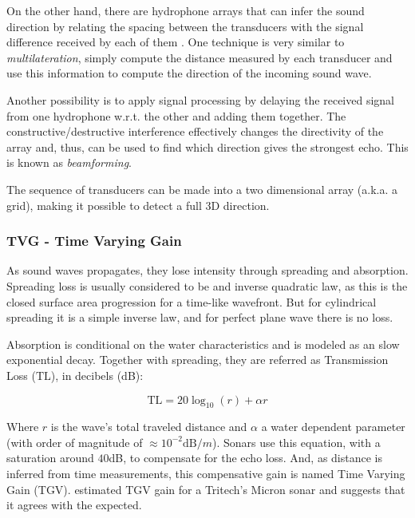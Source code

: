 On the other hand, there are hydrophone arrays that can infer the sound
direction by relating the spacing between the transducers with the signal
difference received by each of them \cite{bearing,beamforming}. One technique is
very similar to \textit{multilateration}, simply compute the distance measured
by each transducer and use this information to compute the direction of the
incoming sound wave.


Another possibility is to apply signal processing by delaying the received
signal from one hydrophone w.r.t. the other and adding them together. The
constructive/destructive interference effectively changes the directivity of the
array and, thus, can be used to find which direction gives the strongest echo.
This is known as \textit{beamforming}.

The sequence of transducers can be made into a two dimensional array
(a.k.a. a grid), making it possible to detect a full 3D direction.

\subsubsection{TVG - Time Varying Gain}\label{sss:tvg}

As sound waves propagates, they lose intensity through spreading and absorption.
Spreading loss is usually considered to be and inverse quadratic
law\cite{Etter2013}, as this is the closed surface area progression for
a time-like wavefront. But for cylindrical spreading it is a simple inverse law,
and for perfect plane wave there is no loss.

Absorption is conditional on the water characteristics and is modeled as an
slow exponential decay. Together with spreading, they are referred as
Transmission Loss ($\text{TL}$), in decibels (dB):

\begin{equation*}
\text{TL} = 20\log_{10}(r) + \alpha r
\end{equation*}

Where $r$ is the wave's total traveled distance and $\alpha$ a water dependent
parameter (with order of magnitude of $\approx 10^{-2} \text{dB}/m$). Sonars use
this equation, with a saturation around $40$dB, to compensate for the echo
loss\cite{chu2006time}. And, as distance is inferred from time measurements,
this compensative gain is named Time Varying Gain (TGV). \citet{chew2013object}
estimated TGV gain for a Tritech's Micron sonar and suggests that it agrees with
the expected.


